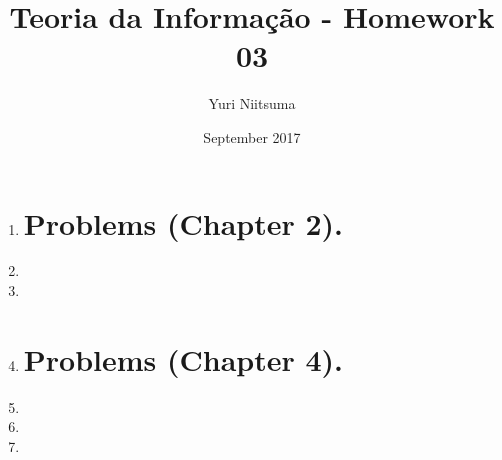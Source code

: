 \documentclass{IEEEtran}
\title{Teoria da Informação - Homework 03}
\author{Yuri Niitsuma}
\date{September 2017}
\begin{document}
\maketitle

\begin{enumerate}
	\section*{Review questions.}

	\item
	

	\section*{Problems (Chapter 2).}

	\item 
	
	\item 
	
	\item 
	

	\section*{Problems (Chapter 4).}

	\item
	
	\item
	
	\item
	
	
\end{enumerate}
\end{document}
